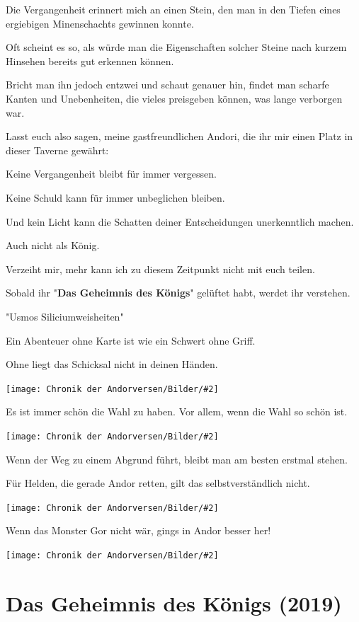 \documentclass[10pt, a4paper, oneside]{book}
\newcommand{\fillbreak}{\vspace*{\fill}\columnbreak}
\newcommand{\produkt}[1]{%
    \section{#1}%
    \label{Produkt: #1}%
}
\newcommand{\bildmitts}[2][height=0.32\textwidth,width=0.48\textwidth,keepaspectratio]{%
    \begin{center}
        \texttt{[image: Chronik der Andorversen/Bilder/\#2]}
    \end{center}
}
\begin{document}
\begin{multicols}{2}
Die Vergangenheit erinnert mich an einen Stein, den man in den Tiefen eines ergiebigen Minenschachts gewinnen konnte. 

Oft scheint es so, als würde man die Eigenschaften solcher Steine nach kurzem Hinsehen bereits gut erkennen können.

Bricht man ihn jedoch entzwei und schaut genauer hin, findet man scharfe Kanten und Unebenheiten, die vieles preisgeben können, was lange verborgen war.

Lasst euch also sagen, meine gastfreundlichen Andori, die ihr mir einen Platz in dieser Taverne gewährt:

Keine Vergangenheit bleibt für immer vergessen.

Keine Schuld kann für immer unbeglichen bleiben.

Und kein Licht kann die Schatten deiner Entscheidungen unerkenntlich machen.

Auch nicht als König.

Verzeiht mir, mehr kann ich zu diesem Zeitpunkt nicht mit euch teilen.

Sobald ihr "\textbf{Das Geheimnis des Königs}" gelüftet habt, werdet ihr verstehen.


\begin{center}
    "Usmos Siliciumweisheiten"
\end{center}

Ein Abenteuer ohne Karte ist wie ein Schwert ohne Griff.

Ohne liegt das Schicksal nicht in deinen Händen.

\bildmitts{Usmos Siliciumweisheiten Bild 1.jpg}

Es ist immer schön die Wahl zu haben. Vor allem, wenn die Wahl so schön ist.

\bildmitts{Usmos Siliciumweisheiten Bild 2.jpg}

Wenn der Weg zu einem Abgrund führt, bleibt man am besten erstmal stehen.

Für Helden, die gerade Andor retten, gilt das selbstverständlich nicht.

\bildmitts{Usmos Siliciumweisheiten Bild 3.png}

Wenn das Monster Gor nicht wär, gings in Andor besser her!

\bildmitts{Usmos Siliciumweisheiten Bild 4.png}





\fillbreak
\produkt{Das Geheimnis des Königs (2019)}





\end{multicols}
\end{document}
